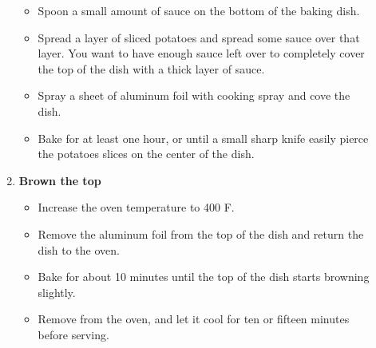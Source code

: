 \documentclass[11pt,letterpaper]{article}
\newcommand \fileName {ScallopedPotatoes}
\begin{document}
\begin{description}
\begin{enumerate}
\begin{itemize}
		\item Spoon a small amount of sauce on the bottom of the baking dish.
		\item Spread a layer of sliced potatoes and spread some sauce over that layer. You want to have enough sauce left over to completely cover the top of the dish with a thick layer of sauce.
		\item Spray a sheet of aluminum foil with cooking spray and cove the dish.
		\item Bake for at least one hour, or until a small sharp knife easily pierce the potatoes slices on the center of the dish.
		\end{itemize}
	\item{\bf Brown the top}
		\begin{itemize}
        		\item Increase the oven temperature to 400 F.
		\item Remove the aluminum foil from the top of the dish and return the dish to the oven.
		\item Bake for about 10 minutes until the top of the dish starts browning slightly.
		\item Remove from the oven, and let it cool for ten or fifteen minutes before serving.	
		\end{itemize} 	
     	\end{enumerate}         
\end{description}

\end{document}
